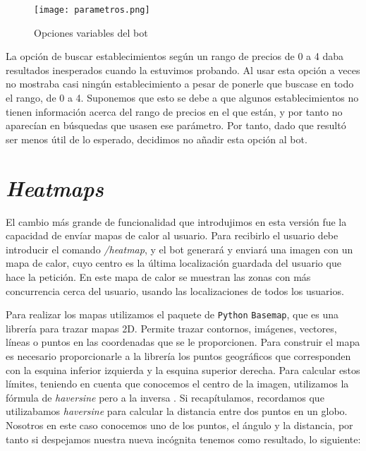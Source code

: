 \documentclass[oneside]{memoir}
\begin{document}
\begin{figure}[h!]
  \centering
  \texttt{[image: parametros.png]}
  \caption{Opciones variables del bot}
  \label{fig:parametros}
\end{figure}

La opción de buscar establecimientos según un rango de precios de 0 a 4 daba resultados inesperados cuando la estuvimos probando. Al usar esta opción a veces no mostraba casi ningún establecimiento a pesar de ponerle que buscase en todo el rango, de 0 a 4. Suponemos que esto se debe a que algunos establecimientos no tienen información acerca del rango de precios en el que están, y por tanto no aparecían en búsquedas que usasen ese parámetro. Por tanto, dado que resultó ser menos útil de lo esperado, decidimos no añadir esta opción al bot.


\section{\textit{Heatmaps}}
El cambio más grande de funcionalidad que introdujimos en esta versión fue la capacidad de envíar mapas de calor al usuario. Para recibirlo el usuario debe introducir el comando \textit{/heatmap}, y el bot generará y enviará una imagen con un mapa de calor, cuyo centro es la última localización guardada del usuario que hace la petición. En este mapa de calor se muestran las zonas con más concurrencia cerca del usuario, usando las localizaciones de todos los usuarios.

Para realizar los mapas utilizamos el paquete de \texttt{Python} \texttt{Basemap}, que es una librería para trazar mapas 2D. Permite trazar contornos, imágenes, vectores, líneas o puntos en las coordenadas que se le proporcionen. Para construir el mapa es necesario proporcionarle a la librería los puntos geográficos que corresponden con la esquina inferior izquierda y la esquina superior derecha. Para calcular estos límites, teniendo en cuenta que conocemos el centro de la imagen, utilizamos la fórmula de \textit{haversine} pero a la inversa \cite{inverso}. Si recapítulamos, recordamos que utilizabamos \textit{haversine} para calcular la distancia entre dos puntos en un globo. Nosotros en este caso conocemos uno de los puntos, el ángulo y la distancia, por tanto si despejamos nuestra nueva incógnita tenemos como resultado, lo siguiente:
 

\end{document}
